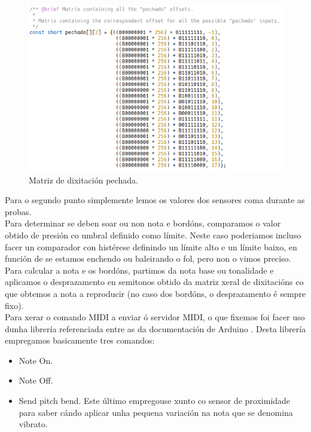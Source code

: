    \begin{figure}[htbp]
    \centering
    \includegraphics[scale=0.6, keepaspectratio=true]{./imagenes/matriz-pechado.png}
    \caption{Matriz de dixitación pechada.}
    \label{figura:MatrizPechado}
   \end{figure}
   
   Para o segundo punto simplemente lemos os valores dos sensores coma durante
   as probas. \\
   
   Para determinar se deben soar ou non nota e bordóns, comparamos o valor
   obtido de presión co umbral definido como límite. Neste caso poderiamos
   incluso facer un comparador con histérese definindo un límite alto e un
   límite baixo, en función de se estamos enchendo ou baleirando o fol, pero non
   o vimos preciso. \\
   
   Para calcular a nota e os bordóns, partimos da nota base ou tonalidade e
   aplicamos o desprazamento en semitonos obtido da matriz xeral de dixitacións
   co que obtemos a nota a reproducir (no caso dos bordóns, o desprazamento é
   sempre fixo). \\
   
   Para xerar o comando MIDI a enviar ó servidor MIDI, o que fixemos foi facer
   uso dunha librería referenciada entre as da documentación de Arduino
   \cite{MIDILibrary}. Desta librería empregamos basicamente tres comandos:
   
   \begin{itemize}
    \item Note On.
    \item Note Off.
    \item Send pitch bend. Este último empregouse xunto co sensor de proximidade
        para saber cándo aplicar unha pequena variación na nota que se denomina
        vibrato.
   \end{itemize}
   
